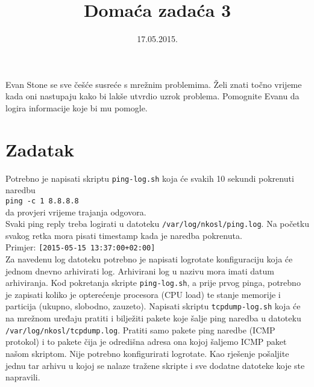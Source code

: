 \documentclass[12pt,a4paper]{article}
\begin{document}
	\title{Domaća zadaća 3}
	\date{\vspace{-5ex} 17.05.2015.}
	\maketitle
	Evan Stone se sve češće susreće s mrežnim problemima. Želi znati točno vrijeme kada oni nastupaju kako bi lakše utvrdio uzrok problema. Pomognite Evanu da logira informacije koje bi mu pomogle.\\
	\section*{Zadatak}
	Potrebno je napisati skriptu \texttt{ping-log.sh} koja će svakih 10 sekundi pokrenuti naredbu\\
	\hspace*{3em} \texttt{ping -c 1 8.8.8.8}\\
	da provjeri vrijeme trajanja odgovora.\\
	Svaki ping reply treba logirati u datoteku \texttt{/var/log/nkosl/ping.log}. Na početku svakog retka mora pisati timestamp kada je naredba pokrenuta.\\
	\hspace*{3em} Primjer: \texttt{[2015-05-15 13:37:00+02:00]}\\
	Za navedenu log datoteku potrebno je napisati logrotate konfiguraciju koja će jednom dnevno arhivirati log. Arhivirani log u nazivu mora imati datum arhiviranja.
	\newline
	\newline
	Kod pokretanja skripte \texttt{ping-log.sh}, a prije prvog pinga, potrebno je zapisati koliko je opterećenje procesora (CPU load) te stanje memorije i particija (ukupno, slobodno, zauzeto).
	\newline
	\newline
	Napisati skriptu \texttt{tcpdump-log.sh} koja će na mrežnom uređaju pratiti i bilježiti pakete koje šalje ping naredba u datoteku \texttt{/var/log/nkosl/tcpdump.log}. Pratiti samo pakete ping naredbe (ICMP protokol) i to pakete čija je odredišna adresa ona kojoj šaljemo ICMP paket našom skriptom. Nije potrebno konfigurirati logrotate. 	
	\newline
	\newline
	Kao rješenje pošaljite jednu tar arhivu u kojoj se nalaze tražene skripte i sve dodatne datoteke koje ste napravili.
\end{document}
